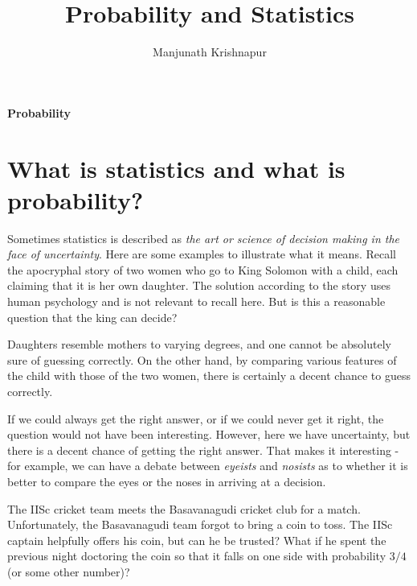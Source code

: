 \documentclass[preprint,  11pt]{amsart}
\begin{document}
\title{Probability and Statistics}
\author{Manjunath Krishnapur}

\maketitle

 \tableofcontents

\newpage

\maketitle

\setcounter{page}{4}



\newpage
\vspace*{\fill}
\begin{center}
\Huge {\bf Probability}
\end{center}
\vspace*{\fill}
\newpage

\section{What is statistics and what is probability?}
Sometimes statistics is described as {\em the art or science of decision making in the face of uncertainty}.  Here are some examples to illustrate what it means.
\beg Recall the apocryphal story of two women who go to King Solomon with a child, each claiming that it is her own daughter. The solution according to the story uses human psychology and is not relevant to recall here. But is this a reasonable question that the king can decide? 

Daughters resemble mothers to varying degrees, and one cannot be absolutely sure of guessing correctly.  
 On the other hand, by comparing various features of the child with those of the two women, there is certainly a decent chance to guess correctly.
   
  If we could always get the right answer, or if we could never get it right, the question would not have been interesting. However, here we have uncertainty, but there is a decent chance of getting the right answer. That makes it interesting - for example, we can have a debate between {\em eyeists}  and {\em nosists} as to whether it is better to compare the eyes or the noses in arriving at a decision.
\eeg

\beg The IISc cricket team meets the Basavanagudi cricket club for a match. Unfortunately, the Basavanagudi team forgot to bring a coin to toss. The IISc captain helpfully offers his coin, but can he be trusted? What if he spent the previous night doctoring the coin so that it falls on one side with probability $3/4$ (or some other number)? 
\end{document}
